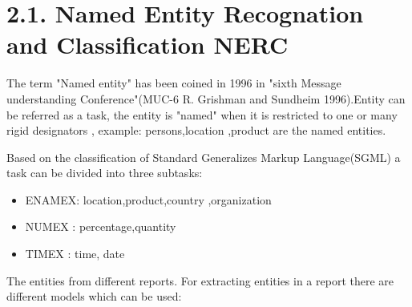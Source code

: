 \section*{2.1. Named Entity Recognation and Classification  NERC}
The term "Named entity" has been coined in 1996 in "sixth  Message understanding Conference"(MUC-6  R. Grishman and  Sundheim 1996).Entity can be referred as a task, the entity is "named" when it is restricted to one or many rigid designators \citep{sharnagat2014named}, example: persons,location ,product are the named entities.

Based on the classification of Standard Generalizes Markup Language(SGML) a task can be divided into three subtasks:
\begin{itemize}
\item ENAMEX: location,product,country ,organization
\item NUMEX : percentage,quantity 
\item TIMEX : time, date
\end{itemize}

The entities from different reports.
For extracting entities in a report there are different models which can be used:

